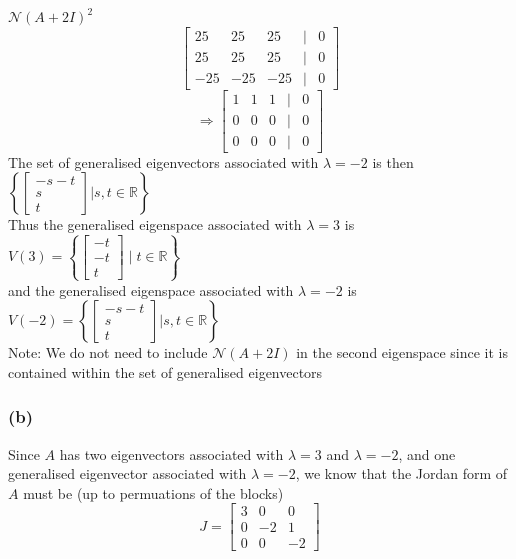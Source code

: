 \documentclass{article}
\begin{document}
\(\mathcal{N}(A + 2I)^2\)
\[
\begin{bmatrix}
    25 & 25 & 25 & | & 0 \\
    25 & 25 & 25 & | & 0 \\
    -25 & -25 & -25 & | & 0 
\end{bmatrix}
\]
\[
\Rightarrow \begin{bmatrix}
    1 & 1 & 1 & | & 0 \\
    0 & 0 & 0 & | & 0 \\
    0 & 0 & 0 & | & 0  
\end{bmatrix}
\]
The set of  generalised eigenvectors associated with \(\lambda = -2\) is then \(\left\{\begin{bmatrix}
    -s -t \\ s \\ t
\end{bmatrix} | s,t \in \mathbb{R} \right\}\)
\\

Thus the generalised eigenspace associated with \(\lambda = 3 \) is \( V(3) = \left\{\begin{bmatrix}
    -t \\ -t \\ t
\end{bmatrix}\mid t \in \mathbb{R} \right\}\)
\\

and the generalised eigenspace associated with \(\lambda = -2\) is 
\( V(-2) = \left\{\begin{bmatrix}
    -s -t \\ s \\ t
\end{bmatrix} | s,t \in \mathbb{R} \right\}
\)
\\

Note: We do not need to include \(\mathcal{N}(A + 2I)\) in the second eigenspace since it is contained within
the set of generalised eigenvectors

\subsubsection*{(b)}
Since \(A\) has two eigenvectors associated with \(\lambda = 3\) and \(\lambda = -2\), and one 
generalised eigenvector associated with \(\lambda = -2\), we know that the Jordan form of \(A\)
must be (up to permuations of the blocks)
\[
J = \begin{bmatrix}
    3 & 0 & 0 \\
    0 & -2 & 1 \\
    0 & 0 & -2
\end{bmatrix}
\]
\end{document}

